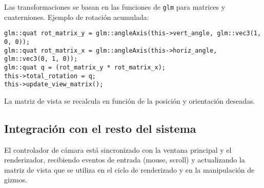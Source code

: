 Las transformaciones se basan en las funciones de \texttt{glm} para matrices y
cuaterniones. Ejemplo de rotación acumulada:
\begin{verbatim}
glm::quat rot_matrix_y = glm::angleAxis(this->vert_angle, glm::vec3(1, 0, 0));
glm::quat rot_matrix_x = glm::angleAxis(this->horiz_angle, glm::vec3(0, 1, 0));
glm::quat q = (rot_matrix_y * rot_matrix_x);
this->total_rotation = q;
this->update_view_matrix();
\end{verbatim}
La matriz de vista se recalcula en función de la posición y orientación
deseadas.

\subsection{Integración con el resto del sistema}

El controlador de cámara está sincronizado con la ventana principal y el
renderizador, recibiendo eventos de entrada (mouse, scroll) y actualizando la
matriz de vista que se utiliza en el ciclo de renderizado y en la manipulación
de gizmos.
